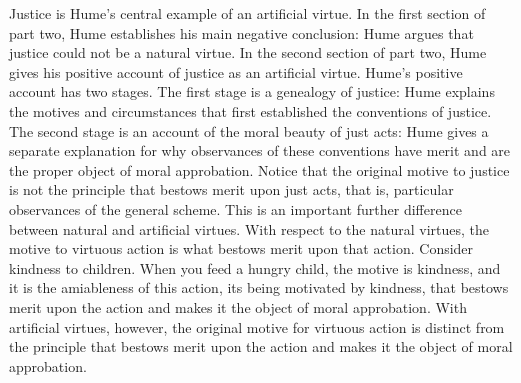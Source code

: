 Justice is Hume's central example of an artificial virtue. In the first section of part two, Hume establishes his main negative conclusion: Hume argues that justice could not be a natural virtue. In the second section of part two, Hume gives his positive account of justice as an artificial virtue.
Hume's positive account has two stages. The first stage is a genealogy of justice: Hume explains the motives and circumstances that first established the conventions of justice. The second stage is an account of the moral beauty of just acts: Hume gives a separate explanation for why observances of these conventions have merit and are the proper object of moral approbation. Notice that the original motive to justice is not the principle that bestows merit upon just acts, that is, particular observances of the general scheme.
This is an important further difference between natural and artificial virtues. With respect to the natural virtues, the motive to virtuous action is what bestows merit upon that action. Consider kindness to children. When you feed a hungry child, the motive is kindness, and it is the amiableness of this action, its being motivated by kindness, that bestows merit upon the action and makes it the object of moral approbation. With artificial virtues, however, the original motive for virtuous action is distinct from the principle that bestows merit upon the action and makes it the object of moral approbation. \change

% 

